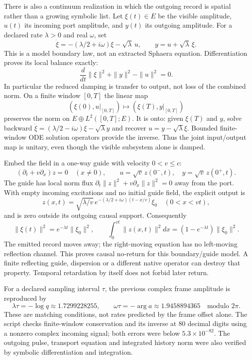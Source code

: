 \documentclass[11pt,a4paper]{article}
\begin{document}
There is also a continuum realization in which the outgoing
record is spatial rather than a growing symbolic list. Let
$\xi(t)\in E$ be the visible amplitude, $u(t)$ its incoming
port amplitude, and $y(t)$ its outgoing amplitude. For a declared
rate $\lambda>0$ and real $\omega$, set
\[
 \dot\xi=-(\lambda/2+i\omega)\xi-\sqrt\lambda\,u,
 \qquad y=u+\sqrt\lambda\,\xi.
\]
This is a model boundary law, not an extracted Sphaera equation.
Differentiation proves its local balance exactly:
\[
 \frac{d}{dt}\|\xi\|^2+\|y\|^2-\|u\|^2=0.
\]
In particular the reduced damping is transfer to output, not loss
of the combined norm. On a finite window $[0,T]$ the linear map
\[
 (\xi(0),u|_{[0,T]})\longmapsto(\xi(T),y|_{[0,T]})
\]
preserves the norm on $E\oplus L^2([0,T];E)$. It is onto:
given $\xi(T)$ and $y$, solve backward
$\dot\xi=(\lambda/2-i\omega)\xi-\sqrt\lambda y$ and recover
$u=y-\sqrt\lambda\xi$. Bounded finite-window ODE solution operators
provide the inverse. Thus the joint input/output map is unitary,
even though the visible subsystem alone is damped.

Embed the field in a one-way guide with velocity $0<v\le c$:
\[
 (\partial_t+v\partial_x)z=0\quad(x\ne0),\qquad
 u=\sqrt v\,z(0^-,t),\quad y=\sqrt v\,z(0^+,t).
\]
The guide has local norm flux
$\partial_t\|z\|^2+v\partial_x\|z\|^2=0$ away from the port.
With empty incoming excitations and no initial guide field, the
explicit output is
\[
 z(x,t)=\sqrt{\lambda/v}\,
 e^{-(\lambda/2+i\omega)(t-x/v)}\xi_0
 \quad(0<x<vt),
\]
and is zero outside its outgoing causal support. Consequently
\[
 \|\xi(t)\|^2=e^{-\lambda t}\|\xi_0\|^2,
 \qquad \int_0^{vt}\!\|z(x,t)\|^2dx
   =(1-e^{-\lambda t})\|\xi_0\|^2.
\]
The emitted record moves away; the right-moving equation has no
left-moving reflection channel. This proves causal no-return for
this boundary/guide model. A finite reflecting guide, dispersion
or a different native operator can destroy that property.
Temporal retardation by itself does not forbid later return.

For a declared sampling interval $\tau$, the previous complex
frame amplitude is reproduced by
\[
 \lambda\tau=-\log q\approx1.7299228255,\qquad
 \omega\tau=-\arg a\approx1.9458894365
 \quad\text{modulo }2\pi.
\]
These are matching conditions, not rates predicted by the
frame offset alone. The script checks finite-window conservation
and its inverse at 80 decimal digits using a nonzero complex
incoming signal; both errors were below $5.3\times10^{-82}$.
The outgoing pulse, transport equation and integrated history norm
were also verified by symbolic differentiation and integration.
\end{document}

